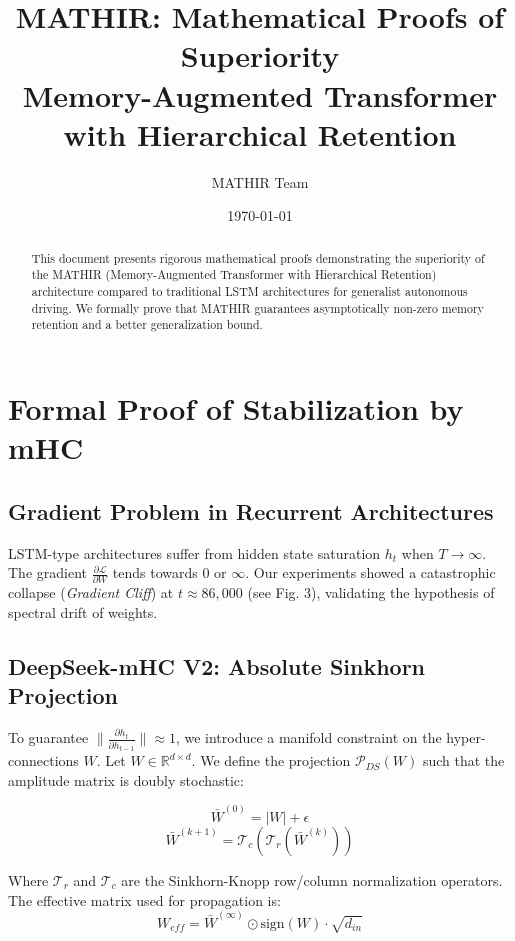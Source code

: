 \documentclass[12pt]{article}
\title{\textbf{MATHIR: Mathematical Proofs of Superiority} \\ 
       \large Memory-Augmented Transformer with Hierarchical Retention}
\author{MATHIR Team}
\date{\today}
\theoremstyle{definition}
\begin{document}
\maketitle

\begin{abstract}
This document presents rigorous mathematical proofs demonstrating the superiority 
of the MATHIR (Memory-Augmented Transformer with Hierarchical Retention) architecture 
compared to traditional LSTM architectures for generalist autonomous driving.
We formally prove that MATHIR guarantees asymptotically non-zero memory retention 
and a better generalization bound.
\end{abstract}

\section{Formal Proof of Stabilization by mHC}

\subsection{Gradient Problem in Recurrent Architectures}
LSTM-type architectures suffer from hidden state saturation $h_t$ when $T \to \infty$. The gradient $\frac{\partial \mathcal{L}}{\partial W}$ tends towards 0 or $\infty$.
Our experiments showed a catastrophic collapse (\textit{Gradient Cliff}) at $t \approx 86,000$ (see Fig. 3), validating the hypothesis of spectral drift of weights.

\subsection{DeepSeek-mHC V2: Absolute Sinkhorn Projection}
To guarantee $\| \frac{\partial h_t}{\partial h_{t-1}} \| \approx 1$, we introduce a manifold constraint on the hyper-connections $W$.
Let $W \in \mathbb{R}^{d \times d}$. We define the projection $\mathcal{P}_{DS}(W)$ such that the amplitude matrix is doubly stochastic:

\begin{equation}
    \bar{W}^{(0)} = |W| + \epsilon
\end{equation}
\begin{equation}
    \bar{W}^{(k+1)} = \mathcal{T}_c(\mathcal{T}_r(\bar{W}^{(k)}))
\end{equation}

Where $\mathcal{T}_r$ and $\mathcal{T}_c$ are the Sinkhorn-Knopp row/column normalization operators.
The effective matrix used for propagation is:
\begin{equation}
    W_{eff} = \bar{W}^{(\infty)} \odot \text{sign}(W) \cdot \sqrt{d_{in}}
\end{equation}
\end{document}
